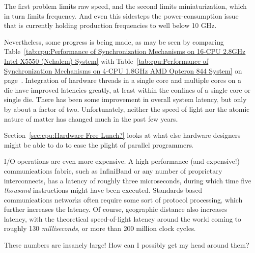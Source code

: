 {	The first problem limits raw speed, and the second limits
	miniaturization, which in turn limits frequency.
	And even this sidesteps the power-consumption issue that
	is currently holding production frequencies to well below
	10 GHz.

	Nevertheless, some progress is being made, as may be seen
	by comparing
	Table~\ref{tab:cpu:Performance of Synchronization Mechanisms on 16-CPU 2.8GHz Intel X5550 (Nehalem) System}
	with
	Table~\ref{tab:cpu:Performance of Synchronization Mechanisms on 4-CPU 1.8GHz AMD Opteron 844 System}
	on
	page~\pageref{tab:cpu:Performance of Synchronization Mechanisms on 4-CPU 1.8GHz AMD Opteron 844 System}.
	Integration of hardware threads in a single core and multiple
	cores on a die have improved latencies greatly, at least within the
	confines of a single core or single die.
	There has been some improvement in overall system latency,
	but only by about a factor of two.
	Unfortunately, neither the speed of light nor the atomic nature
	of matter has changed much in the past few years.

	Section~\ref{sec:cpu:Hardware Free Lunch?}
	looks at what else hardware designers might be
	able to do to ease the plight of parallel programmers.
} \QuickQuizEnd

I/O operations are even more expensive.
A high performance (and expensive!) communications fabric, such as
InfiniBand or any number of proprietary interconnects, has a latency
of roughly three microseconds, during which time five \emph{thousand}
instructions might have been executed.
Standards-based communications networks often require some sort of
protocol processing, which further increases the latency.
Of course, geographic distance also increases latency, with the
theoretical speed-of-light latency around the world coming to
roughly 130 \emph{milliseconds}, or more than 200 million clock
cycles.

\QuickQuiz{}
	These numbers are insanely large!
	How can I possibly get my head around them?
 \QuickQuizEnd
